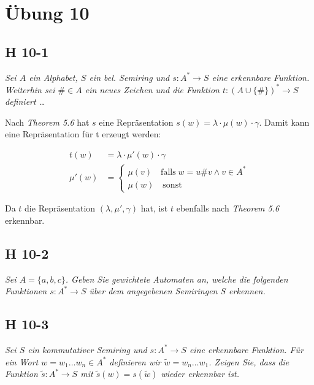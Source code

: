 \documentclass{scrartcl}
\begin{document}
\section{Übung 10}

\subsection{H 10-1}

\textsl{Sei $A$ ein Alphabet, $S$ ein bel. Semiring und $s: A^* \rightarrow S$ eine erkennbare Funktion. Weiterhin sei $\# \in A$ ein neues Zeichen und die Funktion $t: (A \cup \{\#\})^* \rightarrow S$ definiert \ldots}

Nach \emph{Theorem 5.6} hat $s$ eine Repräsentation $s(w) = \lambda\cdot\mu(w)\cdot\gamma$. Damit kann eine Repräsentation für t erzeugt werden:

\begin{align*}
    t(w) &=  \lambda\cdot\mu'(w)\cdot\gamma\\
    \mu'(w) &= \begin{cases} \mu(v)\quad\text{falls}\; w = u\#v \land v \in A^*\\
        \mu(w)\quad\text{sonst}
    \end{cases}
\end{align*}

Da $t$ die Repräsentation $(\lambda, \mu', \gamma)$ hat, ist $t$ ebenfalls nach \emph{Theorem 5.6} erkennbar.

\subsection{H 10-2}

\textsl{Sei $A = \{a,b,c\}$. Geben Sie gewichtete Automaten an, welche die folgenden Funktionen $s: A^* \rightarrow S$ über dem angegebenen Semiringen $S$ erkennen.}

\subsection{H 10-3}

\textsl{Sei $S$ ein kommutativer Semiring und $s: A^* \rightarrow S$ eine erkennbare Funktion. Für ein Wort $w = w_1 \ldots w_n \in A^*$ definieren wir $\tilde{w} = w_n \ldots w_1$. Zeigen Sie, dass die Funktion $\tilde{s} : A^* \rightarrow S$ mit $\tilde{s}(w) = s(\tilde{w})$ wieder erkennbar ist.}
\end{document}
